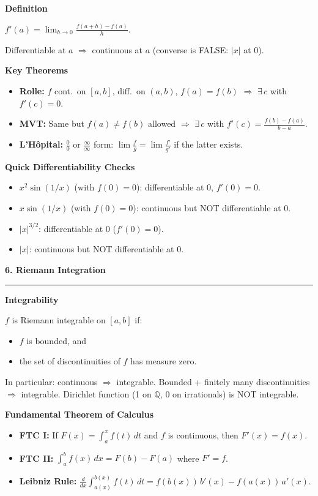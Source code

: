 \documentclass[10pt,twocolumn]{article}
\newcommand{\sect}[1]{\medskip\noindent\textbf{\large #1}\medskip\hrule\smallskip}
\newcommand{\subsect}[1]{\smallskip\noindent\textbf{#1}\par}
\begin{document}
\subsect{Definition}
$f'(a) = \displaystyle\lim_{h\to 0}\frac{f(a+h)-f(a)}{h}$.

Differentiable at $a$ $\Rightarrow$ continuous at $a$ (converse is FALSE: $|x|$ at $0$).

\subsect{Key Theorems}
\begin{itemize}[nosep,leftmargin=*]
\item \textbf{Rolle:} $f$ cont.\ on $[a,b]$, diff.\ on $(a,b)$, $f(a)=f(b)$ $\Rightarrow$ $\exists\,c$ with $f'(c)=0$.
\item \textbf{MVT:} Same but $f(a)\neq f(b)$ allowed $\Rightarrow$ $\exists\,c$ with $f'(c)=\frac{f(b)-f(a)}{b-a}$.
\item \textbf{L'H\^opital:} $\frac{0}{0}$ or $\frac{\infty}{\infty}$ form: $\lim\frac{f}{g}=\lim\frac{f'}{g'}$ if the latter exists.
\end{itemize}

\subsect{Quick Differentiability Checks}
\begin{itemize}[nosep,leftmargin=*]
\item $x^2\sin(1/x)$ (with $f(0)=0$): differentiable at $0$, $f'(0)=0$.
\item $x\sin(1/x)$ (with $f(0)=0$): continuous but NOT differentiable at $0$.
\item $|x|^{3/2}$: differentiable at $0$ ($f'(0)=0$).
\item $|x|$: continuous but NOT differentiable at $0$.
\end{itemize}

\sect{6. Riemann Integration}

\subsect{Integrability}
$f$ is Riemann integrable on $[a,b]$ if:
\begin{itemize}[nosep,leftmargin=*]
\item $f$ is bounded, and
\item the set of discontinuities of $f$ has measure zero.
\end{itemize}
In particular: continuous $\Rightarrow$ integrable. Bounded + finitely many discontinuities $\Rightarrow$ integrable. Dirichlet function (1 on $\mathbb{Q}$, 0 on irrationals) is NOT integrable.

\subsect{Fundamental Theorem of Calculus}
\begin{itemize}[nosep,leftmargin=*]
\item \textbf{FTC I:} If $F(x)=\int_a^x f(t)\,dt$ and $f$ is continuous, then $F'(x)=f(x)$.
\item \textbf{FTC II:} $\int_a^b f(x)\,dx = F(b)-F(a)$ where $F'=f$.
\item \textbf{Leibniz Rule:} $\frac{d}{dx}\int_{a(x)}^{b(x)} f(t)\,dt = f(b(x))\,b'(x)-f(a(x))\,a'(x)$.
\end{itemize}
\end{document}
